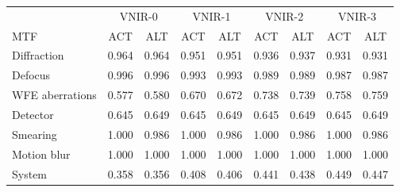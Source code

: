 \begin{tabular}{lcccccccc}
\toprule
 & \multicolumn{2}{c}{VNIR-0} & \multicolumn{2}{c}{VNIR-1} & \multicolumn{2}{c}{VNIR-2} & \multicolumn{2}{c}{VNIR-3} \\
MTF & ACT & ALT & ACT & ALT & ACT & ALT & ACT & ALT \\
\midrule
Diffraction & 0.964 & 0.964 & 0.951 & 0.951 & 0.936 & 0.937 & 0.931 & 0.931 \\
Defocus & 0.996 & 0.996 & 0.993 & 0.993 & 0.989 & 0.989 & 0.987 & 0.987 \\
WFE aberrations & 0.577 & 0.580 & 0.670 & 0.672 & 0.738 & 0.739 & 0.758 & 0.759 \\
Detector & 0.645 & 0.649 & 0.645 & 0.649 & 0.645 & 0.649 & 0.645 & 0.649 \\
Smearing & 1.000 & 0.986 & 1.000 & 0.986 & 1.000 & 0.986 & 1.000 & 0.986 \\
Motion blur & 1.000 & 1.000 & 1.000 & 1.000 & 1.000 & 1.000 & 1.000 & 1.000 \\
System & 0.358 & 0.356 & 0.408 & 0.406 & 0.441 & 0.438 & 0.449 & 0.447 \\
\bottomrule
\end{tabular}
